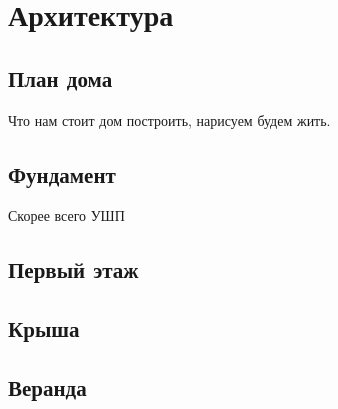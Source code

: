 \part{Архитектура}
\chapter{План дома}
Что нам стоит дом построить, нарисуем будем жить.


\chapter{Фундамент}

Скорее всего УШП

\chapter{Первый этаж}

\chapter{Крыша}

\chapter{Веранда}